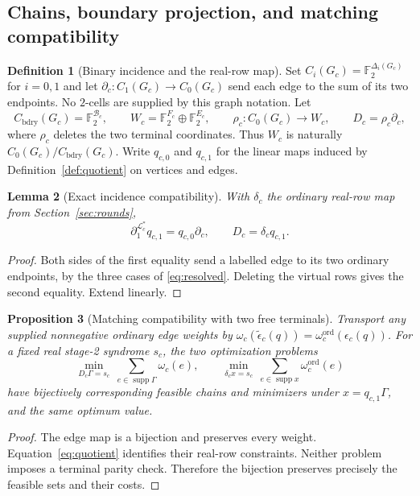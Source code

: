\documentclass[11pt]{article}
\theoremstyle{definition}
\newtheorem{definition}{Definition}[section]
\theoremstyle{plain}
\newtheorem{lemma}[definition]{Lemma}
\newtheorem{proposition}[definition]{Proposition}
\theoremstyle{remark}
\newcommand{\F}{\mathbb F_2}
\newcommand{\LL}{\mathcal L}
\newcommand{\eps}{\epsilon}
\begin{document}
\subsection{Chains, boundary projection, and matching compatibility}
\begin{definition}[Binary incidence and the real-row map]\label{def:chains}
Set $C_i(G_c)=\F^{\Delta_i(G_c)}$ for $i=0,1$ and let
$\partial_c:C_1(G_c)\to C_0(G_c)$ send each edge to the sum of its
two endpoints. No $2$-cells are supplied by this graph notation.
Let
\[
 C_{\mathrm{bdry}}(G_c)=\F^{\mathcal B_c},\qquad
 W_c=\F^{F_c}\oplus\F^{E_c},\qquad
 \rho_c:C_0(G_c)\to W_c,\qquad D_c=\rho_c\partial_c ,
\]
where $\rho_c$ deletes the two terminal coordinates.
Thus $W_c$ is naturally $C_0(G_c)/C_{\mathrm{bdry}}(G_c)$.
Write $q_{c,0}$ and $q_{c,1}$ for the linear maps induced by
Definition~\ref{def:quotient} on vertices and edges.
\end{definition}

\begin{lemma}[Exact incidence compatibility]\label{lem:quotient}
With $\delta_c$ the ordinary real-row map from Section~\ref{sec:rounds},
\begin{equation}
 \partial_1^{\LL_c^*}q_{c,1}=q_{c,0}\partial_c,\qquad
 D_c=\delta_c q_{c,1}.                                      \label{eq:quotient}
\end{equation}
\end{lemma}
\begin{proof}
Both sides of the first equality send a labelled edge to its two
ordinary endpoints, by the three cases of \eqref{eq:resolved}.
Deleting the virtual rows gives the second equality. Extend linearly.
\end{proof}

\begin{proposition}[Matching compatibility with two free terminals]
\label{prop:optimization}
Transport any supplied nonnegative ordinary edge weights by
$\omega_c(\widetilde\eps_c(q))=\omega_c^{\mathrm{ord}}(\eps_c(q))$.
For a fixed real stage-2 syndrome $s_c$, the two optimization problems
\begin{equation}
 \min_{D_c\Gamma=s_c}\ \sum_{e\in\operatorname{supp}\Gamma}\omega_c(e),
 \qquad
 \min_{\delta_c x=s_c}\ \sum_{e\in\operatorname{supp}x}
                                      \omega_c^{\mathrm{ord}}(e)
                                                               \label{eq:opt}
\end{equation}
have bijectively corresponding feasible chains and minimizers under
$x=q_{c,1}\Gamma$, and the same optimum value.
\end{proposition}
\begin{proof}
The edge map is a bijection and preserves every weight.
Equation~\eqref{eq:quotient} identifies their real-row constraints.
Neither problem imposes a terminal parity check. Therefore the
bijection preserves precisely the feasible sets and their costs.
\end{proof}
\end{document}
